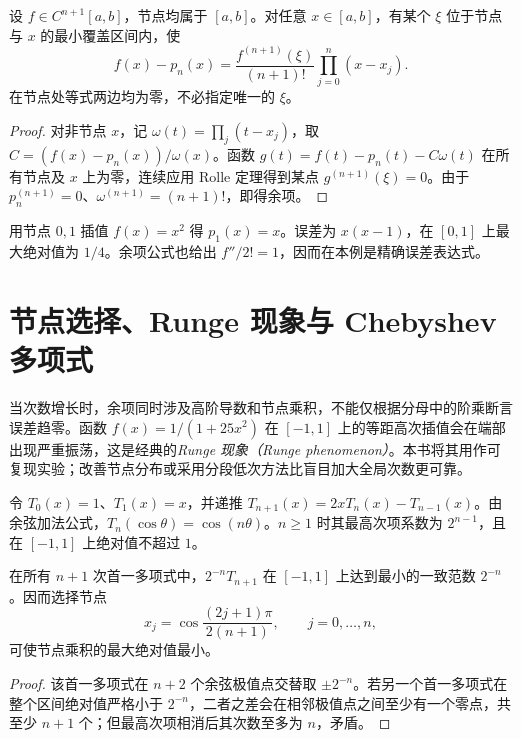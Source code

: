 \begin{theorem}[插值余项]
\label{thm:na-interpolation-error}
设 $f\in C^{n+1}[a,b]$，节点均属于 $[a,b]$。对任意 $x\in[a,b]$，有某个 $\xi$ 位于节点与 $x$ 的最小覆盖区间内，使
\begin{equation}
 f(x)-p_n(x)=\frac{f^{(n+1)}(\xi)}{(n+1)!}\prod_{j=0}^n(x-x_j).
 \label{eq:na-interpolation-error}
\end{equation}
在节点处等式两边均为零，不必指定唯一的 $\xi$。
\end{theorem}
\begin{proof}
对非节点 $x$，记 $\omega(t)=\prod_j(t-x_j)$，取 $C=(f(x)-p_n(x))/\omega(x)$。函数 $g(t)=f(t)-p_n(t)-C\omega(t)$ 在所有节点及 $x$ 上为零，连续应用 Rolle 定理得到某点 $g^{(n+1)}(\xi)=0$。由于 $p_n^{(n+1)}=0$、$\omega^{(n+1)}=(n+1)!$，即得余项。
\end{proof}

\begin{example}[二次函数的线性插值]
用节点 $0,1$ 插值 $f(x)=x^2$ 得 $p_1(x)=x$。误差为 $x(x-1)$，在 $[0,1]$ 上最大绝对值为 $1/4$。余项公式也给出 $f''/2!=1$，因而在本例是精确误差表达式。
\end{example}

\section{节点选择、Runge 现象与 Chebyshev 多项式}
\label{sec:na-chebyshev}
当次数增长时，余项同时涉及高阶导数和节点乘积，不能仅根据分母中的阶乘断言误差趋零。函数 $f(x)=1/(1+25x^2)$ 在 $[-1,1]$ 上的等距高次插值会在端部出现严重振荡，这是经典的\emph{Runge 现象（Runge phenomenon）}。本书将其用作可复现实验；改善节点分布或采用分段低次方法比盲目加大全局次数更可靠。

\begin{definition}
令 $T_0(x)=1$、$T_1(x)=x$，并递推 $T_{n+1}(x)=2xT_n(x)-T_{n-1}(x)$。由余弦加法公式，$T_n(\cos\theta)=\cos(n\theta)$。$n\ge1$ 时其最高次项系数为 $2^{n-1}$，且在 $[-1,1]$ 上绝对值不超过 $1$。
\end{definition}

\begin{proposition}[节点乘积的极小性质]
在所有 $n+1$ 次首一多项式中，$2^{-n}T_{n+1}$ 在 $[-1,1]$ 上达到最小的一致范数 $2^{-n}$。因而选择节点
\[
 x_j=\cos\frac{(2j+1)\pi}{2(n+1)},\qquad j=0,\ldots,n,
\]
可使节点乘积的最大绝对值最小。
\end{proposition}
\begin{proof}
该首一多项式在 $n+2$ 个余弦极值点交替取 $\pm2^{-n}$。若另一个首一多项式在整个区间绝对值严格小于 $2^{-n}$，二者之差会在相邻极值点之间至少有一个零点，共至少 $n+1$ 个；但最高次项相消后其次数至多为 $n$，矛盾。
\end{proof}

